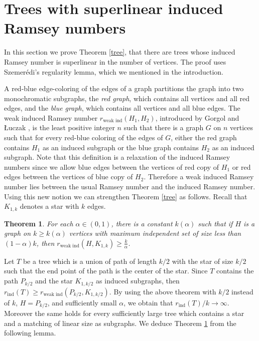 \documentclass[11pt]{article}
\newtheorem{theorem}{Theorem}[section]
\begin{document}
\section{Trees with superlinear induced Ramsey numbers}
\label{superlinear}
In this section we prove Theorem \ref{tree}, that there are trees whose
induced Ramsey number is superlinear in the number of vertices. The proof
uses Szemer\'edi's regularity lemma, which we mentioned in the introduction.

A red-blue edge-coloring of the edges of a graph partitions the
graph into two monochromatic subgraphs, the {\it red graph}, which
contains all vertices and all red edges, and the {\it blue graph},
which contains all vertices and all blue edges. The weak induced
Ramsey number $r_{\textrm{weak ind}}(H_1,H_2)$, introduced by Gorgol
and \L uczak \cite{GoLu}, is the least positive integer $n$ such
that there is a graph $G$ on $n$ vertices such that for every
red-blue coloring of the edges of $G$, either the
red graph contains $H_1$ as an induced subgraph or the blue graph
contains $H_2$ as an induced subgraph. Note that this definition is a relaxation of the
induced Ramsey numbers since we allow blue edges  between the vertices of
red copy of $H_1$ or red edges between the vertices of blue copy of $H_2$.
Therefore a weak induced Ramsey number lies between the
usual Ramsey number and the induced Ramsey number. Using this new notion we
can strengthen Theorem \ref{tree} as follows. Recall that $K_{1,k}$ denotes a star with $k$ edges.

\begin{theorem}\label{weak}
For each $\alpha \in (0,1)$, there is a constant $k(\alpha)$ such that if $H$ is a graph on
$k \geq k(\alpha)$ vertices with maximum independent set of size less than
$(1-\alpha)k$, then $r_{\textrm{weak ind}}(H,K_{1,k}) \geq
\frac{k}{\alpha}$.
\end{theorem}
Let $T$ be a tree which is a union of path of length $k/2$ with the
star of size $k/2$ such that the end point of the path is the center
of the star. Since $T$ contains the path $P_{k/2}$ and the star
$K_{1,k/2}$ as induced subgraphs, then $r_{\textrm{ind}}(T) \geq
r_{\textrm{weak ind}}(P_{k/2},K_{1,k/2})$. By  using the above theorem with
$k/2$ instead of $k$, $H=P_{k/2}$, and sufficiently small
$\alpha$, we obtain that $r_{\textrm{ind}}(T)/k \rightarrow \infty$.
Moreover the same holds for every sufficiently large tree which
contains a star and a matching of linear size as subgraphs. We
deduce Theorem \ref{weak} from the following lemma.
\end{document}
